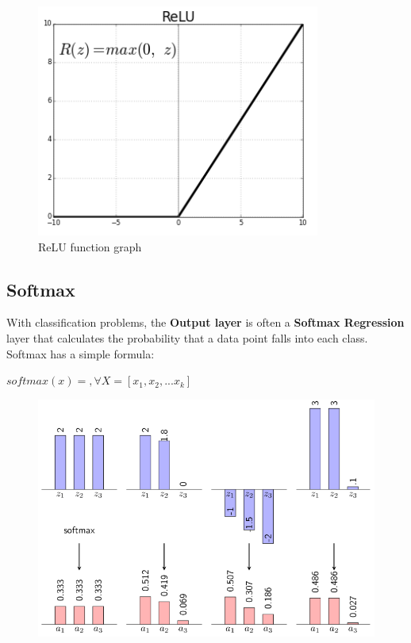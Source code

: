 \begin{itemize}
\begin{center}
		\begin{figure}[H]
			\centering
			\includegraphics[width=0.5\columnwidth]{images/chap2/ReLU.png}
			\caption{ReLU function graph}
			\label{chap2:relu}
		\end{figure}
	\end{center}
\end{itemize}
\vspace{-1cm}
\subsection{Softmax}

With classification problems, the \textbf{Output layer} is often a \textbf{Softmax Regression} layer that calculates the probability that a data point falls into each class. Softmax has a simple formula:\\
\begin{center}
	$ softmax(x) = $$, \forall X = [x_{1},x_{2},...x_{k}]$
\end{center}


\begin{center}
	\begin{figure}[H]
		\centering
		\includegraphics[width=0.75\columnwidth]{images/chap2/Softmax.png}
		\label{chap2:softmax}
	\end{figure}
\end{center}
\vspace{-1cm}
